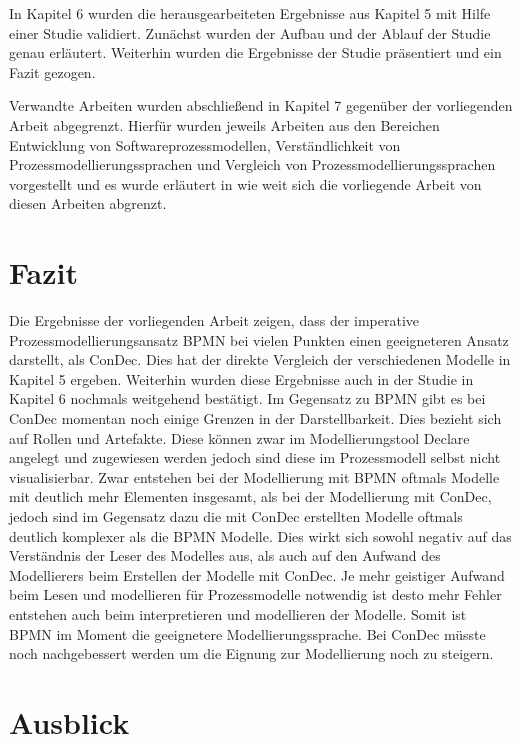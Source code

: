 In Kapitel 6 wurden die herausgearbeiteten Ergebnisse aus Kapitel 5 mit Hilfe einer Studie validiert. Zunächst wurden der Aufbau und der Ablauf der Studie genau erläutert. Weiterhin wurden die Ergebnisse der Studie präsentiert und ein Fazit gezogen. \newline

Verwandte Arbeiten wurden abschließend in Kapitel 7 gegenüber der vorliegenden Arbeit abgegrenzt. Hierfür wurden jeweils Arbeiten aus den Bereichen Entwicklung von Softwareprozessmodellen, Verständlichkeit von Prozessmodellierungssprachen und Vergleich von Prozessmodellierungssprachen vorgestellt und es wurde erläutert in wie weit sich die vorliegende Arbeit von diesen Arbeiten abgrenzt.

\section{Fazit}

Die Ergebnisse der vorliegenden Arbeit zeigen, dass der imperative Prozessmodellierungsansatz BPMN bei vielen Punkten einen geeigneteren Ansatz darstellt, als ConDec. Dies hat der direkte Vergleich der verschiedenen Modelle in Kapitel 5 ergeben. Weiterhin wurden diese Ergebnisse auch in der Studie in Kapitel 6 nochmals weitgehend bestätigt.\newline
Im Gegensatz zu BPMN gibt es bei ConDec momentan noch einige Grenzen in der Darstellbarkeit. Dies bezieht sich auf Rollen und Artefakte. Diese können zwar im Modellierungstool Declare angelegt und zugewiesen werden jedoch sind diese im Prozessmodell selbst nicht visualisierbar.\newline
Zwar entstehen bei der Modellierung mit BPMN oftmals Modelle mit deutlich mehr Elementen insgesamt, als bei der Modellierung mit ConDec, jedoch sind im Gegensatz dazu die mit ConDec erstellten Modelle oftmals deutlich komplexer als die BPMN Modelle. Dies wirkt sich sowohl negativ auf das Verständnis der Leser des Modelles aus, als auch auf den Aufwand des Modellierers beim Erstellen der Modelle mit ConDec. Je mehr geistiger Aufwand beim Lesen und modellieren für Prozessmodelle notwendig ist desto mehr Fehler entstehen auch beim interpretieren und modellieren der Modelle.\newline
Somit ist BPMN im Moment die geeignetere Modellierungssprache. Bei ConDec müsste noch nachgebessert werden um die Eignung zur Modellierung noch zu steigern.\newline


\section{Ausblick}

